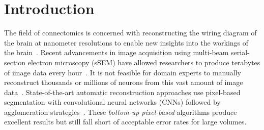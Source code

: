 \section{Introduction}
The field of connectomics is concerned with reconstructing the wiring diagram of the brain at nanometer resolutions to enable new insights into the workings of the brain~\cite{kasthuri2015saturated,haehn2017scalable}. Recent advancements in image acquisition using multi-beam serial-section electron microscopy (sSEM) have allowed researchers to produce terabytes of image data every hour~\cite{hildebrand2017whole}. It is not feasible for domain experts to manually reconstruct thousands or millions of neurons from this vast amount of image data~\cite{haehn2014design}. State-of-the-art automatic reconstruction approaches use pixel-based segmentation with convolutional neural networks (CNNs) followed by agglomeration strategies~\cite{seymour2016rhoananet,nunez2014graph,parag2017anisotropic,zlateski2015image,lee2015recursive,ronneberger2015u}. %
These \textit{bottom-up pixel-based} algorithms produce excellent results but still fall short of acceptable error rates for large volumes.

